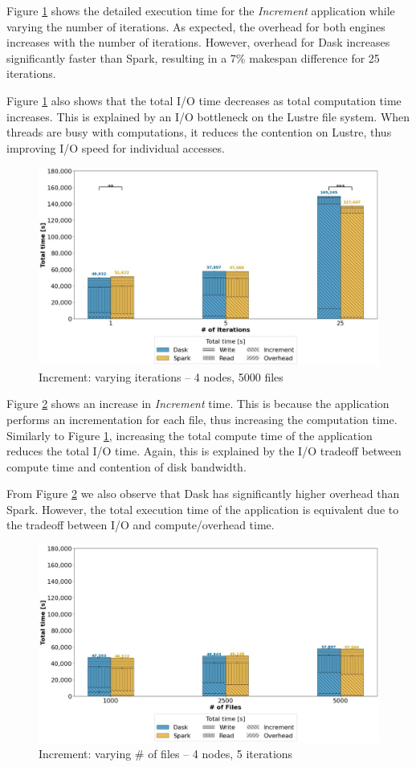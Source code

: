 \documentclass[AMA,STIX1COL]{WileyNJD-v2}
\begin{document}
Figure \ref{fig:increment_itr} shows the detailed execution time for the \textit{Increment} application while varying the number of iterations.
As expected, the overhead for both engines increases with the number of iterations.
However, overhead for Dask increases significantly faster than Spark, resulting in a 7\% makespan difference for 25 iterations.
														
Figure \ref{fig:increment_itr} also shows that the total I/O time decreases as total computation time increases.
This is explained by an I/O bottleneck on the Lustre file system.
When threads are busy with computations, it reduces the contention on Lustre, thus improving I/O speed for individual accesses.
\begin{figure}[!h]
	\centering
	\includegraphics[clip,width=0.75\columnwidth]{figures/stacked_increment_itr.jpg}
	\caption{Increment: varying iterations -- 4 nodes, 5000 files}
	\label{fig:increment_itr}
\end{figure}
														
Figure \ref{fig:increment_block} shows an increase in \textit{Increment} time.
This is because the application performs an incrementation for each file, thus increasing the computation time.
Similarly to Figure \ref{fig:increment_itr}, increasing the total compute time of the application reduces the total I/O time.
Again, this is explained by the I/O tradeoff between compute time and contention of disk bandwidth.
												
From Figure \ref{fig:increment_block} we also observe that Dask has significantly higher overhead than Spark.
However, the total execution time of the application is equivalent due to the tradeoff between I/O and compute/overhead time.
\begin{figure}[!h]
	\centering
	\includegraphics[clip,width=0.75\columnwidth]{figures/stacked_increment_block.jpg}
	\caption{Increment: varying \# of files -- 4 nodes, 5 iterations}
	\label{fig:increment_block}
\end{figure}
																
\end{document}
